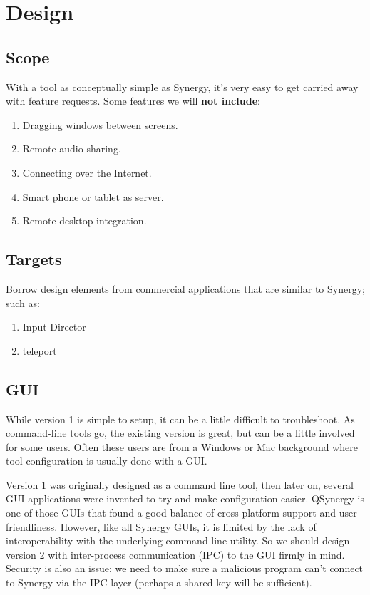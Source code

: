\section{Design}

\subsection{Scope}

With a tool as conceptually simple as Synergy, it's very easy to get carried
away with feature requests. Some features we will \textbf{not include}:

\begin{enumerate}
  \item Dragging windows between screens.
  \item Remote audio sharing.
  \item Connecting over the Internet.
  \item Smart phone or tablet as server.
  \item Remote desktop integration.
\end{enumerate}

\subsection{Targets}

Borrow design elements from commercial applications that are similar to
Synergy; such as:

\begin{enumerate}
  \item Input Director
  \item teleport
\end{enumerate}

\subsection{GUI}

While version 1 is simple to setup, it can be a little difficult to
troubleshoot. As command-line tools go, the existing version is great, but
can be a little involved for some users. Often these users are from a Windows
or Mac background where tool configuration is usually done with a GUI.

Version 1 was originally designed as a command line tool, then later on, several
GUI applications were invented to try and make configuration easier. QSynergy is
one of those GUIs that found a good balance of cross-platform support and user 
friendliness. However, like all Synergy GUIs, it is limited by the lack of 
interoperability with the underlying command line utility. So we should design 
version 2 with inter-process communication (IPC) to the GUI firmly in mind. 
Security is also an issue; we need to make sure a malicious program can't
connect to Synergy via the IPC layer (perhaps a shared key will be sufficient).

